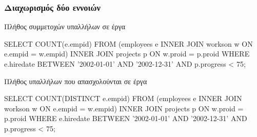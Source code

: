 \begin{frame}
\frametitle{Διαχωρισμός δύο εννοιών}
\begin{minipage}{\wE}
\pause
\vspace{-0.7cm}
\begin{alertblock}{\small Πλήθος συμμετοχών υπαλλήλων σε έργα}
\en
\begin{SQL}
  SELECT COUNT(e.empid)
    FROM (employees e INNER JOIN workson  w
                         ON e.empid = w.empid)
                      INNER JOIN projects p
                         ON w.proid = p.proid
   WHERE e.hiredate BETWEEN '2002-01-01' AND '2002-12-31'
     AND p.progress < 75;
\end{SQL}
\el
\end{alertblock}
\pause
\vspace{-0.7cm}
\begin{exampleblock}{\small Πλήθος υπαλλήλων που απασχολούνται σε έργα}
\en
\begin{SQL}
  SELECT COUNT(DISTINCT e.empid)
    FROM (employees e INNER JOIN workson  w
                         ON e.empid = w.empid)
                      INNER JOIN projects p
                         ON w.proid = p.proid
   WHERE e.hiredate BETWEEN '2002-01-01' AND '2002-12-31'
     AND p.progress < 75;
\end{SQL}
\el
\end{exampleblock}  
\end{minipage}
\end{frame}

